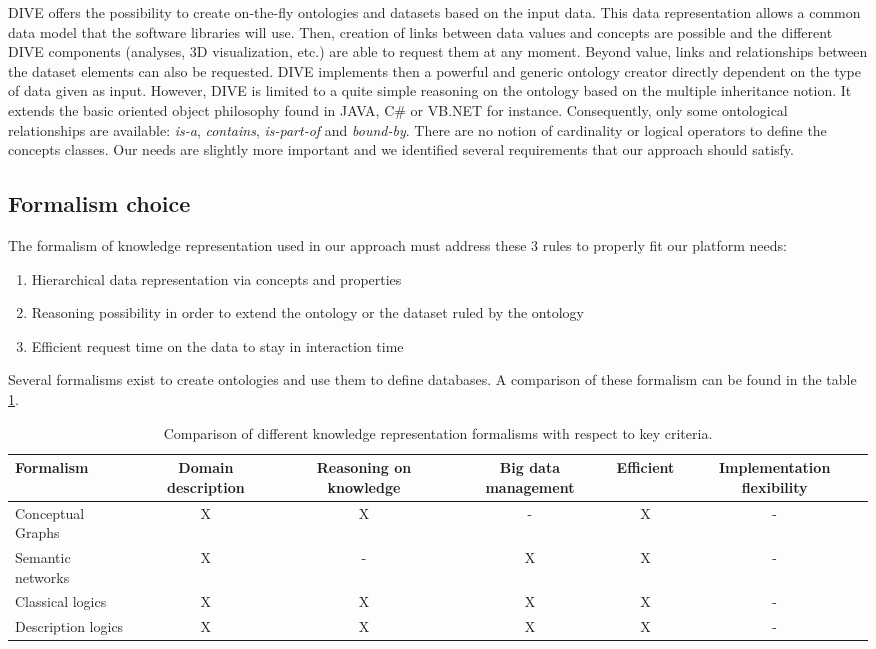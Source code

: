 \documentclass{vgtc}                          %
\begin{document}
DIVE offers the possibility to create on-the-fly ontologies and datasets based on the input data. This data representation allows a common data model that the software libraries will use. Then, creation of links between data values and concepts are possible and the different DIVE components (analyses, 3D visualization, etc.) are able to request them at any moment. Beyond value, links and relationships between the dataset elements can also be requested. DIVE implements then a powerful and generic ontology creator directly dependent on the type of data given as input. However, DIVE is limited to a quite simple reasoning on the ontology based on the multiple inheritance notion. It extends the basic oriented object philosophy found in JAVA, C\# or VB.NET for instance. Consequently, only some ontological relationships are available: \textit{is-a}, \textit{contains}, \textit{is-part-of} and \textit{bound-by}. There are no notion of cardinality or logical operators to define the concepts classes. Our needs are slightly more important and we identified several requirements that our approach should satisfy.


\subsection{Formalism choice}

The formalism of knowledge representation used in our approach must address these 3 rules to properly fit our platform needs:

\begin{enumerate}
  \item Hierarchical data representation via concepts and properties
  \item Reasoning possibility in order to extend the ontology or the dataset ruled by the ontology
  \item Efficient request time on the data to stay in interaction time
\end{enumerate}

Several formalisms exist to create ontologies and use them to define databases. A comparison of these formalism can be found in the table \ref{formalisms_comparison}.

\begin{table}[t]
\begin{tabular}{l|*{5}{c|}}
Formalism          & Domain description & Reasoning on knowledge & Big data management & Efficient & Implementation flexibility \\
\hline
Conceptual Graphs  & X & X & - & X & -  \\
Semantic networks  & X & - & X & X & -  \\
Classical logics   & X & X & X & X & -  \\
Description logics & X & X & X & X & -  \\
\end{tabular}
\caption{Comparison of different knowledge representation formalisms with respect to key criteria.}
  \label{formalisms_comparison}
\end{table}
\end{document}
